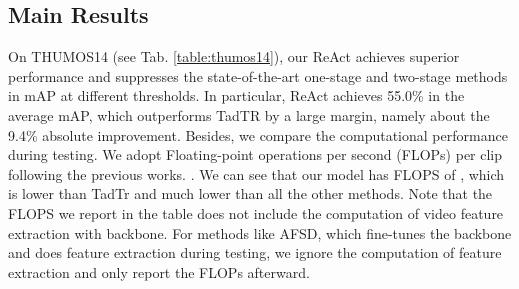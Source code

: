 \documentclass[runningheads]{llncs}
\newcommand{\tabref}[1]{Tab. \ref{#1}}
\def\name{ReAct }
\begin{document}
\subsection{Main Results}
On THUMOS14 (see \tabref{table:thumos14}), our \name achieves superior performance and suppresses the state-of-the-art one-stage and two-stage methods in mAP at different thresholds. In particular, \name achieves 55.0\% in the average mAP, which outperforms TadTR by a large margin, namely about the 9.4\% absolute improvement. Besides, we compare the computational performance during testing. We adopt Floating-point operations per second (FLOPs) per clip following the previous works. \cite{liu2021end,zhu2021enriching}. We can see that our model has FLOPS of , which is  lower than TadTr and much lower than all the other methods. Note that the FLOPS we report in the table does not include the computation of video feature extraction with backbone. For methods like AFSD, which fine-tunes the backbone and does feature extraction during testing, we ignore the computation of feature extraction and only report the FLOPs afterward. 
  
\end{document}
